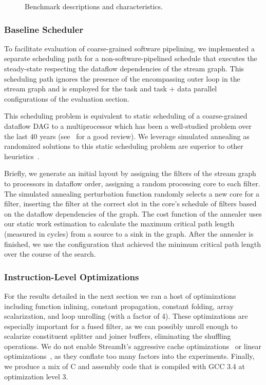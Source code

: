 \begin{figure*}[t]
\centering
{}
\caption{Benchmark descriptions and characteristics.
\protect\label{fig:benchchar}}
\end{figure*}

\subsubsection{Baseline Scheduler}
To facilitate evaluation of coarse-grained software pipelining, we
implemented a separate scheduling path for a non-software-pipelined
schedule that executes the steady-state respecting the dataflow
dependencies of the stream graph.  This scheduling path ignores the
presence of the encompassing outer loop in the stream graph and is
employed for the task and task + data parallel configurations of the
evaluation section.

This scheduling problem is equivalent to static scheduling of a
coarse-grained dataflow DAG to a multiprocessor which has been a
well-studied problem over the last 40 years (see~\cite{DAGSched} for a
good review).  We leverage simulated annealing as randomized solutions
to this static scheduling problem are superior to other
heuristics~\cite{kwok99fastest}.

Briefly, we generate an initial layout by assigning the filters of the
stream graph to processors in dataflow order, assigning a random
processing core to each filter. The simulated annealing perturbation
function randomly selects a new core for a filter, inserting the
filter at the correct slot in the core's schedule of filters based on
the dataflow dependencies of the graph.  The cost function of the
annealer uses our static work estimation to calculate the maximum
critical path length (measured in cycles) from a source to a sink in
the graph.  After the annealer is finished, we use the configuration
that achieved the minimum critical path length over the course of the
search.

\subsubsection{Instruction-Level Optimizations}
For the results detailed in the next section we ran a host of
optimizations including function inlining, constant propagation,
constant folding, array scalarization, and loop unrolling (with a
factor of 4).  These optimizations are especially important for a
fused filter, as we can possibly unroll enough to scalarize
constituent splitter and joiner buffers, eliminating the shuffling
operations.  We do not enable StreamIt's aggressive cache
optimizations~\cite{sermulins:lctes:2005} or linear
optimizations~\cite{lamb:pldi:2003}, as they conflate too many factors
into the experiments.  Finally, we produce a mix of C and assembly
code that is compiled with GCC 3.4 at optimization level 3.
